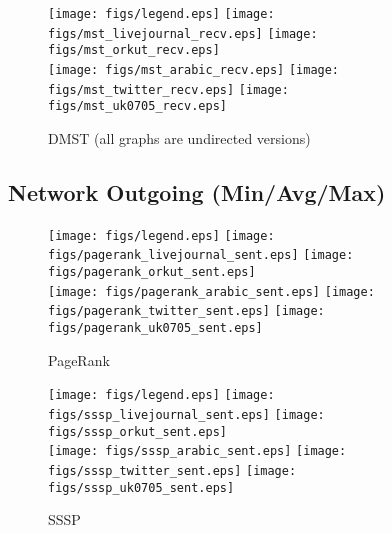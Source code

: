 \documentclass{article}
\newcommand{\bline}[1][1]{\vspace{#1\baselineskip}}
\begin{document}
\begin{figure}[!h]
  \bline[3.5]
  \centering
  \texttt{[image: figs/legend.eps]}\hspace{3em}%
  \texttt{[image: figs/mst\_livejournal\_recv.eps]}\hspace{1em}%
  \texttt{[image: figs/mst\_orkut\_recv.eps]}\\
  \texttt{[image: figs/mst\_arabic\_recv.eps]}\hspace{1em}%
  \texttt{[image: figs/mst\_twitter\_recv.eps]}\hspace{1em}%
  \texttt{[image: figs/mst\_uk0705\_recv.eps]}
  \caption{DMST (all graphs are undirected versions)}
\end{figure}

\pagebreak
\subsection{Network Outgoing (Min/Avg/Max)}
\begin{figure}[!h]
  \bline[1]
  \centering
  \texttt{[image: figs/legend.eps]}\hspace{3em}%
  \texttt{[image: figs/pagerank\_livejournal\_sent.eps]}\hspace{1em}%
  \texttt{[image: figs/pagerank\_orkut\_sent.eps]}\\
  \texttt{[image: figs/pagerank\_arabic\_sent.eps]}\hspace{1em}%
  \texttt{[image: figs/pagerank\_twitter\_sent.eps]}\hspace{1em}%
  \texttt{[image: figs/pagerank\_uk0705\_sent.eps]}
  \caption{PageRank}
\end{figure}

\begin{figure}[!h]
  \bline[3.5]
  \centering
  \texttt{[image: figs/legend.eps]}\hspace{3em}%
  \texttt{[image: figs/sssp\_livejournal\_sent.eps]}\hspace{1em}%
  \texttt{[image: figs/sssp\_orkut\_sent.eps]}\\
  \texttt{[image: figs/sssp\_arabic\_sent.eps]}\hspace{1em}%
  \texttt{[image: figs/sssp\_twitter\_sent.eps]}\hspace{1em}%
  \texttt{[image: figs/sssp\_uk0705\_sent.eps]}
  \caption{SSSP}
\end{figure}
\end{document}
